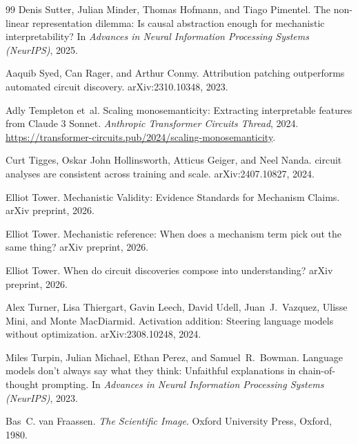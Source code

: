 \documentclass{article}
\begin{document}
\begin{thebibliography}{99}
Denis Sutter, Julian Minder, Thomas Hofmann, and Tiago Pimentel.
\newblock The non-linear representation dilemma: Is causal abstraction enough
  for mechanistic interpretability?
\newblock In \emph{Advances in Neural Information Processing Systems
  (NeurIPS)}, 2025.

Aaquib Syed, Can Rager, and Arthur Conmy.
\newblock Attribution patching outperforms automated circuit discovery.
\newblock arXiv:2310.10348, 2023.

Adly Templeton et~al.
\newblock Scaling monosemanticity: Extracting interpretable features from
  {Claude 3 Sonnet}.
\newblock \emph{Anthropic Transformer Circuits Thread}, 2024.
\newblock \url{https://transformer-circuits.pub/2024/scaling-monosemanticity}.

Curt Tigges, Oskar John Hollinsworth, Atticus Geiger, and Neel Nanda.
 circuit analyses are consistent across training and scale.
\newblock arXiv:2407.10827, 2024.

Elliot Tower.
\newblock Mechanistic Validity: Evidence Standards for Mechanism Claims.
\newblock arXiv preprint, 2026.

Elliot Tower.
\newblock Mechanistic reference: When does a mechanism term pick out the same
  thing?
\newblock arXiv preprint, 2026.

Elliot Tower.
\newblock When do circuit discoveries compose into understanding?
\newblock arXiv preprint, 2026.

Alex Turner, Lisa Thiergart, Gavin Leech, David Udell, Juan~J.\ Vazquez,
  Ulisse Mini, and Monte MacDiarmid.
\newblock Activation addition: Steering language models without optimization.
\newblock arXiv:2308.10248, 2024.

Miles Turpin, Julian Michael, Ethan Perez, and Samuel~R.\ Bowman.
\newblock Language models don't always say what they think: Unfaithful
  explanations in chain-of-thought prompting.
\newblock In \emph{Advances in Neural Information Processing Systems (NeurIPS)}, 2023.

Bas~C. van Fraassen.
\newblock \emph{The Scientific Image}.
\newblock Oxford University Press, Oxford, 1980.


\end{thebibliography}
\end{document}

